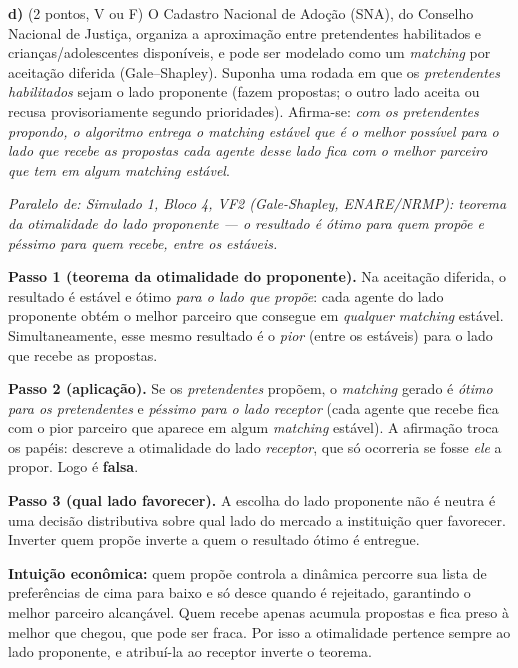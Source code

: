 \textbf{d)} (2 pontos, V ou F) O Cadastro Nacional de Ado\c{c}\~ao (SNA), do Conselho Nacional de Justi\c{c}a, organiza a aproxima\c{c}\~ao entre pretendentes habilitados e crian\c{c}as/adolescentes dispon\'iveis, e pode ser modelado como um \emph{matching} por aceita\c{c}\~ao diferida (Gale--Shapley). Suponha uma rodada em que os \emph{pretendentes habilitados} sejam o lado proponente (fazem propostas; o outro lado aceita ou recusa provisoriamente segundo prioridades). Afirma-se: \emph{com os pretendentes propondo, o algoritmo entrega o matching est\'avel que \'e o melhor poss\'ivel para o lado que recebe as propostas \textemdash{} cada agente desse lado fica com o melhor parceiro que tem em algum matching est\'avel}.

\begin{solucao}
{\footnotesize\textit{Paralelo de: Simulado 1, Bloco 4, VF2 (Gale-Shapley, ENARE/NRMP): teorema da otimalidade do lado proponente — o resultado é ótimo para quem propõe e péssimo para quem recebe, entre os estáveis.}}\par\vspace{0.2em}
\textbf{Passo 1 (teorema da otimalidade do proponente).} Na aceita\c{c}\~ao diferida, o resultado \'e est\'avel e \'otimo \emph{para o lado que prop\~oe}: cada agente do lado proponente obt\'em o melhor parceiro que consegue em \emph{qualquer} \emph{matching} est\'avel. Simultaneamente, esse mesmo resultado \'e o \emph{pior} (entre os est\'aveis) para o lado que recebe as propostas.

\textbf{Passo 2 (aplica\c{c}\~ao).} Se os \emph{pretendentes} prop\~oem, o \emph{matching} gerado \'e \emph{\'otimo para os pretendentes} e \emph{p\'essimo para o lado receptor} (cada agente que recebe fica com o pior parceiro que aparece em algum \emph{matching} est\'avel). A afirma\c{c}\~ao troca os pap\'eis: descreve a otimalidade do lado \emph{receptor}, que s\'o ocorreria se fosse \emph{ele} a propor. Logo \'e \textbf{falsa}.

\textbf{Passo 3 (qual lado favorecer).} A escolha do lado proponente n\~ao \'e neutra \textemdash{} \'e uma decis\~ao distributiva sobre qual lado do mercado a institui\c{c}\~ao quer favorecer. Inverter quem prop\~oe inverte a quem o resultado \'otimo \'e entregue.

\textbf{Intui\c{c}\~ao econ\^omica:} quem prop\~oe controla a din\^amica \textemdash{} percorre sua lista de prefer\^encias de cima para baixo e s\'o desce quando \'e rejeitado, garantindo o melhor parceiro alcan\c{c}\'avel. Quem recebe apenas acumula propostas e fica preso \`a melhor que chegou, que pode ser fraca. Por isso a otimalidade pertence sempre ao lado proponente, e atribu\'i-la ao receptor inverte o teorema.
\end{solucao}

